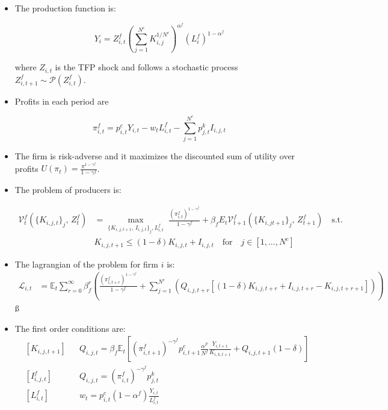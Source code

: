 \documentclass[11pt]{article}
\newcommand{\E}{\mathbb{E}}
\numberwithin{equation}{section}
\begin{document}
\begin{itemize}
	
\item The production function is:

 $$Y_i = Z^f_{i,t} \left( \sum_{j=1}^{N^c } K^{1/N^c}_{i,j}\right)^{\alpha^f} \left(L_i^f\right)^{1-\alpha^f}$$
 
 where $Z_{i,t}$ is the TFP shock and follows a stochastic process $Z^f_{i,t+1} \sim \mathcal{P}(Z^f_{i,t})$. 
	
\item Profits in each period are

$$\pi^f_{i,t}=p^c_{i,t} Y_{i,t}-w_{t}  L^f_{i,t}-\sum_{j=1}^{N^c} p^k_{j,t} I_{i,j,t}$$

\item The firm is risk-adverse and it maximizes the discounted sum of utility over profits $U(\pi_t) = \frac{\pi^{1-\gamma^f}}{1-\gamma^f}$.

\item The problem of producers is:

\begin{align*}
\mathcal{V}_{t}^{f}\left(\{K_{i,j,t}\}_j,\,Z_t^f\right)&=\max_{\{K_{i,j,t+1},\, I_{i,j,t}\}_j,  L^f_{i,t}}\,\,
\frac{\left(\pi_{i,t}^f\right)^{1-\gamma^f}}{1-\gamma^f}+\beta_f E_{t}\mathcal{V}^f_{t+1}(\{K_{i,jt+1}\}_j,\,Z_{t+1}^f)\quad\text{{s.t.}}\\
&K_{i,j,t+1} \leq(1-\delta)K_{i,j,t}+I_{i,j,t} \quad \text{for} \quad j \in [1,...,N^c]
\end{align*}

\item The lagrangian of the problem for firm $i$ is:
\begin{align*}
\mathcal{L}_{i,t} &= \E_t \sum_{r=0}^{\infty}\beta^r_f \left(\frac{\left(\pi_{i,t+r}^f\right)^{1-\gamma^f}}{1-\gamma^f} +
\sum_{j=1}^{N^c} \left(Q_{i,j,t+r} [(1-\delta)K_{i,j,t+r}+I_{i,j,t+r} -K_{i,j,t+r+1}]\right) \right)
\end{align*}ß

\item The first order conditions are:
\begin{align}
& \left[K_{i,j,t+1}\right]
&&
Q_{i,j,t} =\beta_f \E_t \left[\left(\pi_{i,t+1}^f\right)^{-\gamma^f} p^c_{i,t+1} \frac{\alpha^F}{N^f} \frac{Y_{i,t+1}}{K_{i,k,t+1}} +Q_{i,j,t+1} (1-\delta) \right]
\\
& \left[ I^f_{i,j,t} \right]
&&
Q_{i,j,t} = \left(\pi_{i,t}^f\right)^{-\gamma^f} p^k_{j,t}
\\
& \left[ L^f_{i,t}\right]
&&
w_t = p^c_{i,t} (1-\alpha^f) \frac{Y_{i,t}}{ L^f_{i,t}}
\end{align}




\end{itemize}
\end{document}
